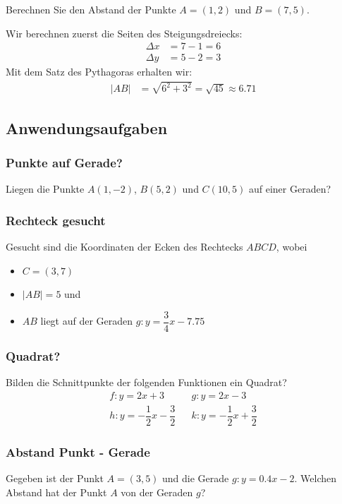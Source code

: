 \begin{example}
    Berechnen Sie den Abstand der Punkte $A=(1,2)$ und $B=(7,5)$.

    Wir berechnen zuerst die Seiten des Steigungsdreiecks:
    \begin{align*}
        \Delta x & = 7 - 1 = 6 \\
        \Delta y & = 5 - 2 = 3
    \end{align*}
    Mit dem Satz des Pythagoras erhalten wir:
    \begin{align*}
        |AB| & = \sqrt{6^2 + 3^2} = \sqrt{45} \approx 6.71
    \end{align*}
\end{example}
\newpage
\subsection{Anwendungsaufgaben}
\subsubsection*{Punkte auf Gerade?}
Liegen die Punkte $A(1,-2)$, $B(5,2)$ und $C(10,5)$ auf einer Geraden?
\newpage
\subsubsection*{Rechteck gesucht}
Gesucht sind die Koordinaten der Ecken des Rechtecks $ABCD$, wobei
\begin{itemize}
    \item $C=(3,7)$
    \item $|AB|= 5$ und
    \item $AB$ liegt auf der Geraden $g: y = \dfrac{3}{4}x -7.75$
\end{itemize}
\newpage
\subsubsection*{Quadrat?}
Bilden die Schnittpunkte der folgenden Funktionen ein Quadrat?
\begin{align*}
    f:y=2x+3                        &  &
    g:y=2x-3                             \\
    h:y=-\dfrac{1}{2}x-\dfrac{3}{2} &  &
    k:y=-\dfrac{1}{2}x+\dfrac{3}{2}
\end{align*}
\newpage
\subsubsection*{Abstand Punkt - Gerade}
Gegeben ist der Punkt $A=(3,5)$ und die Gerade $g:y=0.4x-2$. Welchen Abstand hat der Punkt $A$ von der Geraden $g$?
\newpage
